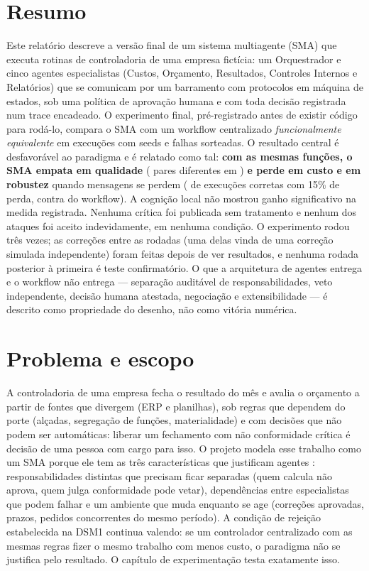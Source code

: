 \documentclass[10pt,a4paper]{article}
\begin{document}
\section*{Resumo}
Este relatório descreve a versão final de um sistema multiagente (SMA) que executa rotinas de controladoria de uma
empresa fictícia: um Orquestrador e cinco agentes especialistas (Custos, Orçamento, Resultados, Controles Internos e
Relatórios) que se comunicam por um barramento com protocolos em máquina de estados, sob uma política de aprovação
humana e com toda decisão registrada num trace encadeado. O experimento final, pré-registrado antes de existir
código para rodá-lo, compara o SMA com um workflow centralizado \emph{funcionalmente equivalente} em
 execuções com  seeds e falhas sorteadas. O resultado central é desfavorável ao
paradigma e é relatado como tal: \textbf{com as mesmas funções, o SMA empata em qualidade} (
pares diferentes em ) \textbf{e perde em custo e em robustez} quando mensagens se perdem (
de execuções corretas com 15\% de perda, contra  do workflow). A cognição local
não mostrou ganho significativo na medida registrada. Nenhuma crítica foi publicada sem tratamento e nenhum dos
 ataques foi aceito indevidamente, em nenhuma condição. O experimento rodou três vezes; as
correções entre as rodadas (uma delas vinda de uma correção simulada independente) foram feitas depois de ver
resultados, e nenhuma rodada posterior à primeira é teste confirmatório. O que a arquitetura de agentes entrega
e o workflow não entrega --- separação auditável de responsabilidades, veto independente, decisão humana atestada,
negociação e extensibilidade --- é descrito como propriedade do desenho, não como vitória numérica.

\section{Problema e escopo}
A controladoria de uma empresa fecha o resultado do mês e avalia o orçamento a partir de fontes que divergem (ERP e
planilhas), sob regras que dependem do porte (alçadas, segregação de funções, materialidade) e com decisões que não
podem ser automáticas: liberar um fechamento com não conformidade crítica é decisão de uma pessoa com cargo para isso.
O projeto modela esse trabalho como um SMA porque ele tem as três características que justificam agentes
\parencite{wooldridge2009,cancian2026}: responsabilidades distintas que precisam ficar separadas (quem calcula não
aprova, quem julga conformidade pode vetar), dependências entre especialistas que podem falhar e um ambiente que muda
enquanto se age (correções aprovadas, prazos, pedidos concorrentes do mesmo período). A condição de rejeição
estabelecida na DSM1 continua valendo: se um controlador centralizado com as mesmas regras fizer o mesmo trabalho com
menos custo, o paradigma não se justifica pelo resultado. O capítulo de experimentação testa exatamente isso.
\end{document}
